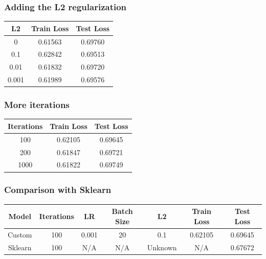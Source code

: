 \documentclass[
	letterpaper, %
	10pt, %
]{class}
\begin{document}
\subsubsection{Adding the L2 regularization}

\begin{center}
  \begin{tabular}{ |c|c|c| }
    \hline
    L2    & Train Loss & Test Loss \\
    \hline
    0     & 0.61563    & 0.69760   \\
    0.1   & 0.62842    & 0.69513   \\
    0.01  & 0.61832    & 0.69720   \\
    0.001 & 0.61989    & 0.69576   \\
    \hline
  \end{tabular}
\end{center}

\subsubsection{More iterations}

\begin{center}
  \begin{tabular}{ |c|c|c| }
    \hline
    Iterations & Train Loss & Test Loss \\
    \hline
    100        & 0.62105    & 0.69645   \\
    200        & 0.61847    & 0.69721   \\
    1000       & 0.61822    & 0.69749   \\
    \hline
  \end{tabular}
\end{center}

\subsubsection{Comparison with Sklearn}

\begin{center}
  \begin{tabular}{ |c|c|c|c|c|c|c| }
    \hline
    Model   & Iterations & LR    & Batch Size & L2      & Train Loss & Test Loss \\
    \hline
    Custom  & 100        & 0.001 & 20         & 0.1     & 0.62105    & 0.69645   \\
    Sklearn & 100        & N/A   & N/A        & Unknown & N/A        & 0.67672   \\
    \hline
  \end{tabular}
\end{center}
\end{document}
